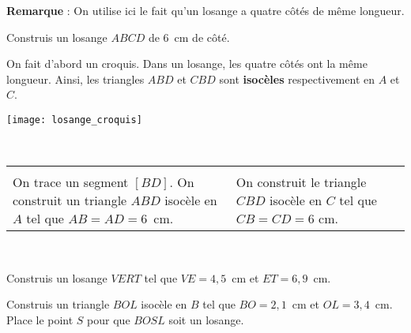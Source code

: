 
\begin{methode*1}
 
\vspace{0.8em}
\textcolor{H1}{\textbf{Remarque}} : On utilise ici le fait qu'un losange a quatre côtés de même longueur.

\begin{exemple*1}
Construis un losange $ABCD$ de 6 cm de côté.\\[1em]
\begin{minipage}[c]{0.7\linewidth}
On fait d'abord un croquis. Dans un losange, les quatre côtés ont la même longueur. Ainsi, les triangles $ABD$ et $CBD$ sont \textbf{isocèles} respectivement en $A$ et $C$.
 \end{minipage} \hfill%
 \begin{minipage}[c]{0.24\linewidth}
  \texttt{[image: losange\_croquis]}
  \end{minipage} \\
  
\begin{tabularx}{\textwidth}{X|X}
\qquad  & \qquad  \\
 On trace un segment $[BD]$. On construit un triangle $ABD$ isocèle en $A$ tel que $AB = AD = 6$ cm. & On construit le triangle $CBD$ isocèle en $C$ tel que $CB = CD = 6$ cm. \\
\end{tabularx} \\

 \end{exemple*1}

\exercice
Construis un losange $VERT$ tel que $VE = 4,5$ cm et $ET = 6,9$ cm.

\vspace{3.5cm}

\exercice
Construis un triangle $BOL$ isocèle en $B$ tel que $BO = 2,1$ cm et $OL = 3,4$ cm. Place le point $S$ pour que $BOSL$ soit un losange.

\end{methode*1}


